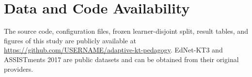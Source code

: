 \documentclass[11pt]{article}
\begin{document}
\section*{Data and Code Availability}
The source code, configuration files, frozen learner-disjoint split, result tables, and figures of this study are publicly available at \url{https://github.com/USERNAME/adaptive-kt-pedagogy}. EdNet-KT3 and ASSISTments 2017 are public datasets and can be obtained from their original providers.


\end{document}
